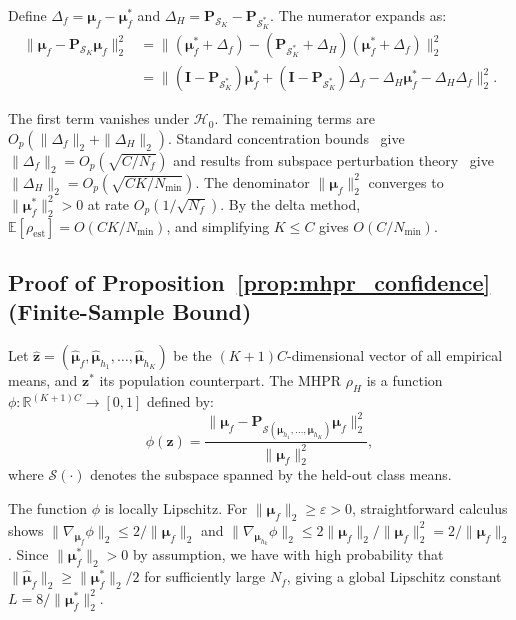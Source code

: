\documentclass[journal]{IEEEtran}
\theoremstyle{definition}
\begin{document}
Define $\Delta_f = \boldsymbol{\mu}_f - \boldsymbol{\mu}_f^*$ and $\Delta_H = \mathbf{P}_{\mathcal{S}_K} - \mathbf{P}_{\mathcal{S}_K^*}$. The numerator expands as:
\begin{align}
\|\boldsymbol{\mu}_f - \mathbf{P}_{\mathcal{S}_K}\boldsymbol{\mu}_f\|_2^2 &= \|(\boldsymbol{\mu}_f^* + \Delta_f) - (\mathbf{P}_{\mathcal{S}_K^*} + \Delta_H)(\boldsymbol{\mu}_f^* + \Delta_f)\|_2^2 \nonumber\\
&= \|(\mathbf{I} - \mathbf{P}_{\mathcal{S}_K^*})\boldsymbol{\mu}_f^* + (\mathbf{I} - \mathbf{P}_{\mathcal{S}_K^*})\Delta_f - \Delta_H\boldsymbol{\mu}_f^* - \Delta_H\Delta_f\|_2^2.
\end{align}

The first term vanishes under $\mathcal{H}_0$. The remaining terms are $O_p(\|\Delta_f\|_2 + \|\Delta_H\|_2)$. Standard concentration bounds~\cite{vershynin2018high} give $\|\Delta_f\|_2 = O_p(\sqrt{C/N_f})$ and results from subspace perturbation theory~\cite{stewart1990matrix} give $\|\Delta_H\|_2 = O_p(\sqrt{CK/N_{\min}})$. The denominator $\|\boldsymbol{\mu}_f\|_2^2$ converges to $\|\boldsymbol{\mu}_f^*\|_2^2 > 0$ at rate $O_p(1/\sqrt{N_f})$. By the delta method, $\mathbb{E}[\rho_{\mathrm{est}}] = O(CK/N_{\min})$, and simplifying $K \le C$ gives $O(C/N_{\min})$.

\subsection{Proof of Proposition~\ref{prop:mhpr_confidence} (Finite-Sample Bound)}

Let $\hat{\mathbf{z}} = (\hat{\boldsymbol{\mu}}_f, \hat{\boldsymbol{\mu}}_{h_1},\dots,\hat{\boldsymbol{\mu}}_{h_K})$ be the $(K+1)C$-dimensional vector of all empirical means, and $\mathbf{z}^*$ its population counterpart. The MHPR $\rho_H$ is a function $\phi: \mathbb{R}^{(K+1)C} \to [0,1]$ defined by:
\begin{equation}
\phi(\mathbf{z}) = \frac{\|\boldsymbol{\mu}_f - \mathbf{P}_{\mathcal{S}(\boldsymbol{\mu}_{h_1},\dots,\boldsymbol{\mu}_{h_K})}\boldsymbol{\mu}_f\|_2^2}{\|\boldsymbol{\mu}_f\|_2^2},
\end{equation}
where $\mathcal{S}(\cdot)$ denotes the subspace spanned by the held-out class means.

The function $\phi$ is locally Lipschitz. For $\|\boldsymbol{\mu}_f\|_2 \ge \varepsilon > 0$, straightforward calculus shows $\|\nabla_{\boldsymbol{\mu}_f}\phi\|_2 \le 2/\|\boldsymbol{\mu}_f\|_2$ and $\|\nabla_{\boldsymbol{\mu}_{h_k}}\phi\|_2 \le 2\|\boldsymbol{\mu}_f\|_2/\|\boldsymbol{\mu}_f\|_2^2 = 2/\|\boldsymbol{\mu}_f\|_2$. Since $\|\boldsymbol{\mu}_f^*\|_2 > 0$ by assumption, we have with high probability that $\|\hat{\boldsymbol{\mu}}_f\|_2 \ge \|\boldsymbol{\mu}_f^*\|_2/2$ for sufficiently large $N_f$, giving a global Lipschitz constant $L = 8/\|\boldsymbol{\mu}_f^*\|_2^2$.
\end{document}
